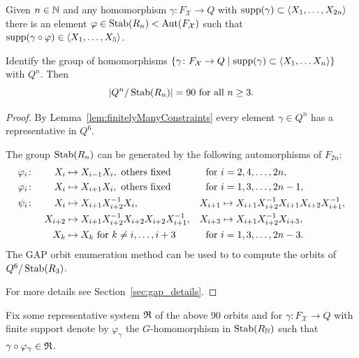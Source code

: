 \documentclass[a4paper,11pt]{amsart}
\begin{document}
\begin{lem}\label{lem:finitelyManyConstraints}
 Given $n\in \mathbb{N}$ and any homomorphism $\gamma\colon F_{\mathcal{X}} \to Q$ with $\operatorname{{supp}}(\gamma) \subset \left<X_1,\ldots ,X_{2n}\right>$
 there is an element $\varphi \in \operatorname{Stab}(R_n)<\operatorname{{Aut}}(F_{\mathcal{X}})$ such that $\operatorname{{supp}}(\gamma\circ\varphi) \in \left<X_1,\dotsc,X_5\right>$.
\end{lem}
\begin{lem}\label{lem:90Constraints}
 Identify the group of homomorphisms $\{\gamma \colon F_{\mathcal{X}} \to Q \mid \operatorname{{supp}}(\gamma) \subset \left<X_1,\ldots X_n\right>\}$ with $Q^n$. 
 Then \[\left|{Q^n/\operatorname{Stab}(R_n)}\right|=90 \text{ for all } n\geq 3	.\]
\end{lem}
\begin{proof}
By Lemma~\ref{lem:finitelyManyConstraints} every element $\gamma\in Q^n$ has a representative in $Q^6$.

 The group $\operatorname{Stab}(R_n)$ can be generated by the 
 following automorphisms of $F_{2n}$:
 \begin{align*}
  \varphi_i&\colon& X_i&\mapsto X_{i-1}X_i, \textup{ others fixed} & \textup{for }&i=2,4,\dotsc,2n , \\
  \varphi_i&\colon&X_i&\mapsto X_{i+1}X_i, \textup{ others fixed} & \textup{for }&i=1,3,\dotsc,2n-1 ,\\
  \psi_i&\colon&X_i&\mapsto X_{i+1}X_{i+2}^{-1}X_i, &X_{i+1}&\mapsto X_{i+1}X_{i+2}^{-1}X_{i+1}X_{i+2}X_{i+1}^{-1},\\  
  &&X_{i+2}&\mapsto X_{i+1}X_{i+2}^{-1}X_{i+2}X_{i+2}X_{i+1}^{-1}, &X_{i+3}&\mapsto X_{i+1}X_{i+2}^{-1}X_{i+3},\\
  &&X_k &\mapsto X_k \textup{ for } k\neq i,\dotsc,i+3 & \textup{for }&i=1,3,\dotsc,2n-3 .  
 \end{align*}
 The GAP orbit enumeration method  can be used to 
 to compute the orbits of ${Q^6/\operatorname{Stab}(R_3)}$.
 
 For more details see Section~\ref{sec:gap_details}.
\end{proof}
 Fix some representative system $\mathfrak{R}$ of the above $90$ orbits and for 
 $\gamma \colon F_{\mathcal{X}} \to Q$ with finite support denote by $\varphi_\gamma$ the $G$-homomorphism in $\operatorname{Stab}(R_{\mathbb{N}})$ such that $\gamma\circ \varphi_\gamma \in \mathfrak{R}$.
 
\end{document}
